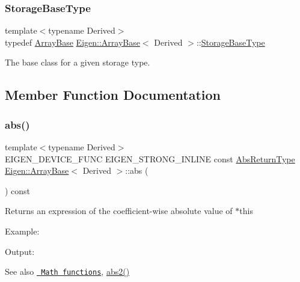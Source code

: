 \subsubsection{\texorpdfstring{StorageBaseType}{StorageBaseType}}
{\footnotesize\ttfamily template$<$typename Derived$>$ \\
typedef \mbox{\hyperlink{class_eigen_1_1_array_base}{Array\+Base}} \mbox{\hyperlink{class_eigen_1_1_array_base}{Eigen\+::\+Array\+Base}}$<$ Derived $>$\+::\mbox{\hyperlink{class_eigen_1_1_array_base_a7c296f02281624d9c76eb864ab7209ce}{Storage\+Base\+Type}}}

The base class for a given storage type. 

\subsection{Member Function Documentation}
\mbox{\label{class_eigen_1_1_array_base_a5efe92eb15ea504206269a2a19b9878c}} 
\subsubsection{\texorpdfstring{abs()}{abs()}}
{\footnotesize\ttfamily template$<$typename Derived$>$ \\
E\+I\+G\+E\+N\+\_\+\+D\+E\+V\+I\+C\+E\+\_\+\+F\+U\+NC E\+I\+G\+E\+N\+\_\+\+S\+T\+R\+O\+N\+G\+\_\+\+I\+N\+L\+I\+NE const \mbox{\hyperlink{class_eigen_1_1_cwise_unary_op}{Abs\+Return\+Type}} \mbox{\hyperlink{class_eigen_1_1_array_base}{Eigen\+::\+Array\+Base}}$<$ Derived $>$\+::abs (\begin{DoxyParamCaption}{ }\end{DoxyParamCaption}) const\hspace{0.3cm}{\ttfamily [inline]}}

\begin{DoxyReturn}{Returns}
an expression of the coefficient-\/wise absolute value of {\ttfamily $\ast$this} 
\end{DoxyReturn}
Example\+: 
\begin{DoxyCodeInclude}{0}
\end{DoxyCodeInclude}
 Output\+: 
\begin{DoxyVerbInclude}
\end{DoxyVerbInclude}


\begin{DoxySeeAlso}{See also}
\href{group__CoeffwiseMathFunctions.html\#cwisetable_abs}{\texttt{ Math functions}}, \mbox{\hyperlink{class_eigen_1_1_array_base_ad213e9822777ff03219eed7063c26971}{abs2()}} 
\end{DoxySeeAlso}
\mbox{\label{class_eigen_1_1_array_base_ad213e9822777ff03219eed7063c26971}} 
